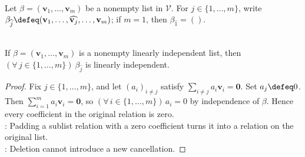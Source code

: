 \begin{definition} \label{def:omitting-vector-from-list} \\
Let $\beta=(\mathbf{v}_1,\ldots,\mathbf{v}_m)$ be a nonempty list in $\mathcal{V}$. For $j\in\{1,\ldots,m\}$, write $\beta_{\widehat{j}}\defeq(\mathbf{v}_1,\ldots,\widehat{\mathbf{v}_j},\ldots,\mathbf{v}_m)$; if $m=1$, then $\beta_{\widehat{1}}=()$.
\end{definition}

\begin{proposition} \label{prop:omittingfromindependentlist} \\
If $\beta=(\mathbf{v}_1,\ldots,\mathbf{v}_m)$ is a nonempty linearly independent list, then $(\forall\,j\in\{1,\ldots,m\})\ \beta_{\widehat{j}}$ is linearly independent.
\begin{proof}
Fix $j\in\{1,\ldots,m\}$, and let $(a_i)_{i\neq j}$ satisfy $\sum\limits_{i\neq j}a_i\mathbf{v}_i=\mathbf{0}$. Set $a_j\defeq0$.\\
Then $\sum\limits_{i=1}^{m}a_i\mathbf{v}_i=\mathbf{0}$, so $(\forall\,i\in\{1,\ldots,m\})\,a_i=0$ by independence of $\beta$. Hence every coefficient in the original relation is zero.\\
: Padding a sublist relation with a zero coefficient turns it into a relation on the original list.\\
: Deletion cannot introduce a new cancellation.
\end{proof}
\end{proposition}

